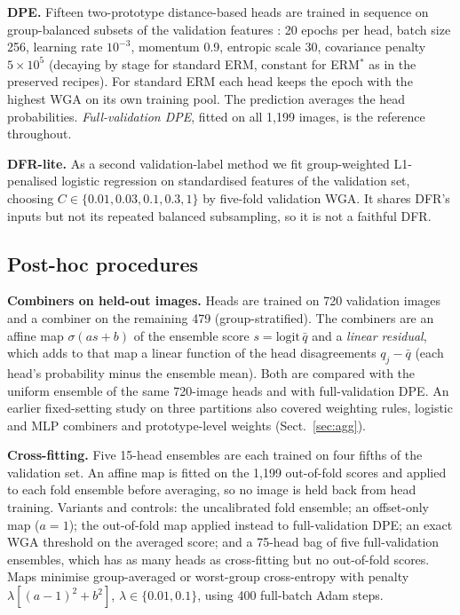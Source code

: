 \textbf{DPE.} Fifteen two-prototype distance-based heads are trained in sequence on group-balanced subsets of the validation features \cite{to2025dpe}: 20 epochs per head, batch size 256, learning rate $10^{-3}$, momentum 0.9, entropic scale 30, covariance penalty $5\times10^5$ (decaying by stage for standard ERM, constant for ERM$^*$ as in the preserved recipes). For standard ERM each head keeps the epoch with the highest WGA on its own training pool. The prediction averages the head probabilities. \emph{Full-validation DPE}, fitted on all 1,199 images, is the reference throughout.

\textbf{DFR-lite.} As a second validation-label method we fit group-weighted L1-penalised logistic regression on standardised features of the validation set, choosing $C\in\{0.01,0.03,0.1,0.3,1\}$ by five-fold validation WGA. It shares DFR's inputs \cite{kirichenko2023dfr} but not its repeated balanced subsampling, so it is not a faithful DFR.

\subsection{Post-hoc procedures}
\textbf{Combiners on held-out images.} Heads are trained on 720 validation images and a combiner on the remaining 479 (group-stratified). The combiners are an affine map $\sigma(a s+b)$ of the ensemble score $s=\mathrm{logit}\,\bar q$ and a \emph{linear residual}, which adds to that map a linear function of the head disagreements $q_j-\bar q$ (each head's probability minus the ensemble mean). Both are compared with the uniform ensemble of the same 720-image heads and with full-validation DPE. An earlier fixed-setting study on three partitions also covered weighting rules, logistic and MLP combiners and prototype-level weights (Sect.~\ref{sec:agg}).

\textbf{Cross-fitting.} Five 15-head ensembles are each trained on four fifths of the validation set. An affine map is fitted on the 1,199 out-of-fold scores and applied to each fold ensemble before averaging, so no image is held back from head training. Variants and controls: the uncalibrated fold ensemble; an offset-only map ($a=1$); the out-of-fold map applied instead to full-validation DPE; an exact WGA threshold on the averaged score; and a 75-head bag of five full-validation ensembles, which has as many heads as cross-fitting but no out-of-fold scores. Maps minimise group-averaged or worst-group cross-entropy with penalty $\lambda[(a-1)^2+b^2]$, $\lambda\in\{0.01,0.1\}$, using 400 full-batch Adam steps.

